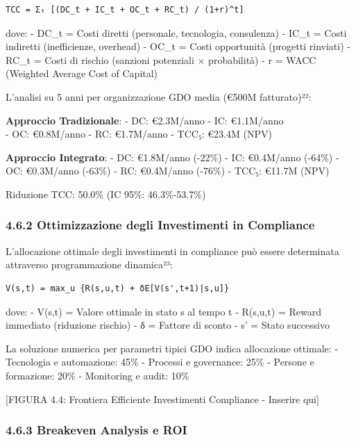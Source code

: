 \documentclass{report}
\begin{document}
\begin{verbatim}
TCC = Σₜ [(DC_t + IC_t + OC_t + RC_t) / (1+r)^t]
\end{verbatim}

dove: - DC\_t = Costi diretti (personale, tecnologia, consulenza) -
IC\_t = Costi indiretti (inefficienze, overhead) - OC\_t = Costi
opportunità (progetti rinviati) - RC\_t = Costi di rischio (sanzioni
potenziali × probabilità) - r = WACC (Weighted Average Cost of Capital)

L'analisi su 5 anni per organizzazione GDO media (€500M fatturato)²²:

\textbf{Approccio Tradizionale}: - DC: €2.3M/anno - IC: €1.1M/anno\\
- OC: €0.8M/anno - RC: €1.7M/anno - TCC₅: €23.4M (NPV)

\textbf{Approccio Integrato}: - DC: €1.8M/anno (-22\%) - IC: €0.4M/anno
(-64\%) - OC: €0.3M/anno (-63\%) - RC: €0.4M/anno (-76\%) - TCC₅: €11.7M
(NPV)

Riduzione TCC: 50.0\% (IC 95\%: 46.3\%-53.7\%)

\subsubsection{4.6.2 Ottimizzazione degli Investimenti in
Compliance}\label{ottimizzazione-degli-investimenti-in-compliance}

L'allocazione ottimale degli investimenti in compliance può essere
determinata attraverso programmazione dinamica²³:

\begin{verbatim}
V(s,t) = max_u {R(s,u,t) + δE[V(s',t+1)|s,u]}
\end{verbatim}

dove: - V(s,t) = Valore ottimale in stato s al tempo t - R(s,u,t) =
Reward immediato (riduzione rischio) - δ = Fattore di sconto - s' =
Stato successivo

La soluzione numerica per parametri tipici GDO indica allocazione
ottimale: - Tecnologia e automazione: 45\% - Processi e governance: 25\%
- Persone e formazione: 20\% - Monitoring e audit: 10\%

{[}FIGURA 4.4: Frontiera Efficiente Investimenti Compliance - Inserire
qui{]}

\subsubsection{4.6.3 Breakeven Analysis e
ROI}\label{breakeven-analysis-e-roi}
\end{document}
